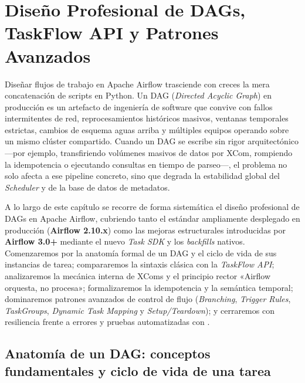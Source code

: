 
\chapter{Diseño Profesional de DAGs, TaskFlow API y Patrones Avanzados}\label{chap:airflow-dags}

Diseñar flujos de trabajo en Apache Airflow trasciende con creces la mera concatenación de scripts en Python. Un DAG (\textit{Directed Acyclic Graph}) en producción es un artefacto de ingeniería de software que convive con fallos intermitentes de red, reprocesamientos históricos masivos, ventanas temporales estrictas, cambios de esquema aguas arriba y múltiples equipos operando sobre un mismo clúster compartido. Cuando un DAG se escribe sin rigor arquitectónico ---por ejemplo, transfiriendo volúmenes masivos de datos por XCom, rompiendo la idempotencia o ejecutando consultas en tiempo de parseo---, el problema no solo afecta a ese pipeline concreto, sino que degrada la estabilidad global del \textit{Scheduler} y de la base de datos de metadatos.

A lo largo de este capítulo se recorre de forma sistemática el diseño profesional de DAGs en Apache Airflow, cubriendo tanto el estándar ampliamente desplegado en producción (\textbf{Airflow 2.10.x}) como las mejoras estructurales introducidas por \textbf{Airflow 3.0+}  mediante el nuevo \textit{Task SDK} y los \textit{backfills} nativos. Comenzaremos por la anatomía formal de un DAG y el ciclo de vida de sus instancias de tarea; compararemos la sintaxis clásica con la \textit{TaskFlow API}; analizaremos la mecánica interna de XComs y el principio rector «Airflow orquesta, no procesa»; formalizaremos la idempotencia y la semántica temporal; dominaremos patrones avanzados de control de flujo (\textit{Branching}, \textit{Trigger Rules}, \textit{TaskGroups}, \textit{Dynamic Task Mapping} y \textit{Setup/Teardown}); y cerraremos con resiliencia frente a errores y pruebas automatizadas con .

\section{Anatomía de un DAG: conceptos fundamentales y ciclo de vida de una tarea}\label{sec:anatomia-dag}

